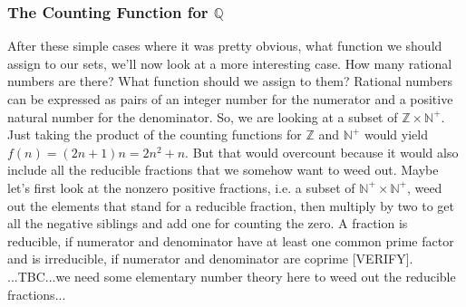 \documentclass[12pt]{article}
\begin{document}
\subsubsection{The Counting Function for $\mathbb{Q}$}
After these simple cases where it was pretty obvious, what function we should assign to our sets, we'll now look at a more interesting case. How many rational numbers are there? What function should we assign to them? Rational numbers can be expressed as pairs of an integer number for the numerator and a positive natural number for the denominator. So, we are looking at a subset of $\mathbb{Z} \times \mathbb{N}^+$. Just taking the product of the counting functions for $\mathbb{Z}$ and $\mathbb{N}^+$ would yield $f(n) = (2 n + 1) n = 2 n^2 + n$. But that would overcount because it would also include all the reducible fractions that we somehow want to weed out. Maybe let's first look at the nonzero positive fractions, i.e. a subset of $\mathbb{N}^+ \times \mathbb{N}^+$, weed out the elements that stand for a reducible fraction, then multiply by two to get all the negative siblings and add one for counting the zero. A fraction is reducible, if numerator and denominator have at least one common prime factor and is irreducible, if numerator and denominator are coprime [VERIFY]. ...TBC...we need some elementary number theory here to weed out the reducible fractions...




\end{document}
